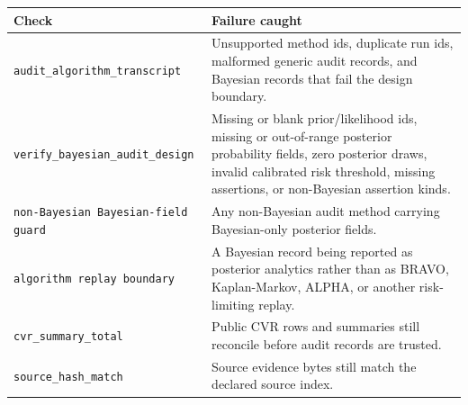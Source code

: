 \begin{center}
\small
\begin{tabularx}{\textwidth}{lX}
\toprule
Check & Failure caught \\
\midrule
\texttt{audit\_algorithm\_transcript} & Unsupported method ids, duplicate run ids, malformed generic audit records, and Bayesian records that fail the design boundary. \\
\texttt{verify\_bayesian\_audit\_design} & Missing or blank prior/likelihood ids, missing or out-of-range posterior probability fields, zero posterior draws, invalid calibrated risk threshold, missing assertions, or non-Bayesian assertion kinds. \\
\texttt{non-Bayesian Bayesian-field guard} & Any non-Bayesian audit method carrying Bayesian-only posterior fields. \\
\texttt{algorithm replay boundary} & A Bayesian record being reported as posterior analytics rather than as BRAVO, Kaplan-Markov, ALPHA, or another risk-limiting replay. \\
\texttt{cvr\_summary\_total} & Public CVR rows and summaries still reconcile before audit records are trusted. \\
\texttt{source\_hash\_match} & Source evidence bytes still match the declared source index. \\
\bottomrule
\end{tabularx}
\end{center}
